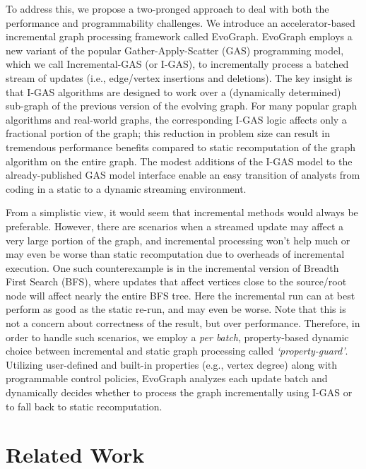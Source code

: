 To address this, we propose a two-pronged approach to deal with both the performance and programmability challenges. We introduce an accelerator-based incremental graph processing framework called EvoGraph. EvoGraph employs a new variant of  the popular Gather-Apply-Scatter (GAS) programming model, which we call Incremental-GAS (or I-GAS), to incrementally process a batched stream of updates (i.e., edge/vertex insertions and deletions).  The key insight is that I-GAS algorithms are designed to work over a (dynamically determined) sub-graph of the previous version of the evolving graph.  For many popular graph algorithms and real-world graphs, the corresponding I-GAS logic affects only a fractional portion of the graph; this reduction in problem size can result in tremendous performance benefits compared to static recomputation of the graph algorithm on the entire graph.  The modest additions of the I-GAS model to the already-published GAS model interface enable an easy transition of analysts from coding in a static to a dynamic streaming environment.

From a simplistic view, it would seem that incremental methods would always be preferable.  However, there are scenarios when a streamed update may affect a very large portion of the graph, and incremental processing won't help much or may even be worse than static recomputation due to overheads of incremental execution. One such counterexample is in the incremental version of Breadth First Search (BFS), where updates that affect vertices close to the source/root node will affect nearly the entire BFS tree. Here the incremental run can at best perform as good as the static re-run, and may even be worse. Note that this is not a concern about correctness of the result, but over performance.  Therefore, in order to handle such scenarios, we employ a \textit{per batch}, property-based dynamic choice between incremental and static graph processing called \textit{‘property-guard’}. Utilizing user-defined and built-in properties (e.g., vertex degree) along with programmable control policies, EvoGraph analyzes each update batch and dynamically decides whether to process the graph incrementally using I-GAS or to fall back to static recomputation. 



\section{Related Work}


